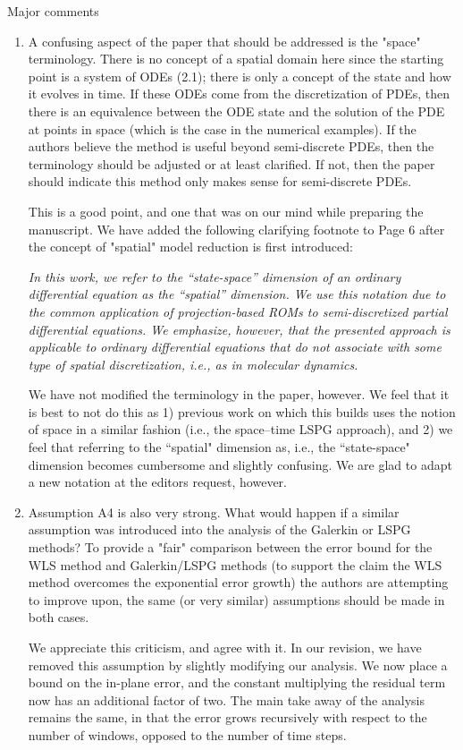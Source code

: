 \documentclass[3p,computermodern,10pt]{elsarticle}
\begin{document}
Major comments
\begin{enumerate}
\item A confusing aspect of the paper that should be addressed is the "space" terminology. There is no concept of a spatial domain here since the starting point is a system of ODEs (2.1); there is only a concept of the state and how it evolves in time. If these ODEs come from the discretization of PDEs, then there is an equivalence between the ODE state and the solution of the PDE at points in space (which is the case in the numerical examples). If the authors believe the method is useful beyond semi-discrete PDEs, then the terminology should be adjusted or at least clarified. If not, then the paper should indicate this method only makes sense for semi-discrete PDEs.

{\color{red} This is a good point, and one that was on our mind while preparing the manuscript. We have added the following clarifying footnote to Page 6 after the concept of "spatial" model reduction is first introduced:

\textit{In this work, we refer to the “state-space” dimension of an ordinary differential equation as the “spatial” dimension. We use this notation due to the common application of projection-based ROMs to semi-discretized partial differential equations. We emphasize, however, that the presented approach is applicable to ordinary differential equations that do not associate with some type of spatial discretization, i.e., as in molecular dynamics.}

We have not modified the terminology in the paper, however. We feel that it is best to not do this as 1) previous work on which this builds uses the notion of space in a similar fashion (i.e., the space--time LSPG approach), and 2) we feel that referring to the ``spatial" dimension as, i.e., the ``state-space" dimension becomes cumbersome and slightly confusing. We are glad to adapt a new notation at the editors request, however.} 


 \item  Assumption A4 is also very strong. What would happen if a similar assumption was introduced into the analysis of the Galerkin or LSPG methods? To provide a "fair" comparison between the error bound for the WLS method and Galerkin/LSPG methods (to support the claim the WLS method overcomes the exponential error growth) the authors are attempting to improve upon, the same (or very similar) assumptions should be made in both cases.

{\color{red} We appreciate this criticism, and agree with it. In our revision, we have removed this assumption by slightly modifying our analysis. We now place a bound on the in-plane error, and the constant multiplying the residual term now has an additional factor of two. The main take away of  the analysis remains the same, in that the error grows recursively with respect to the number of windows, opposed to the number of time steps.}
           

\end{enumerate}
\end{document}
